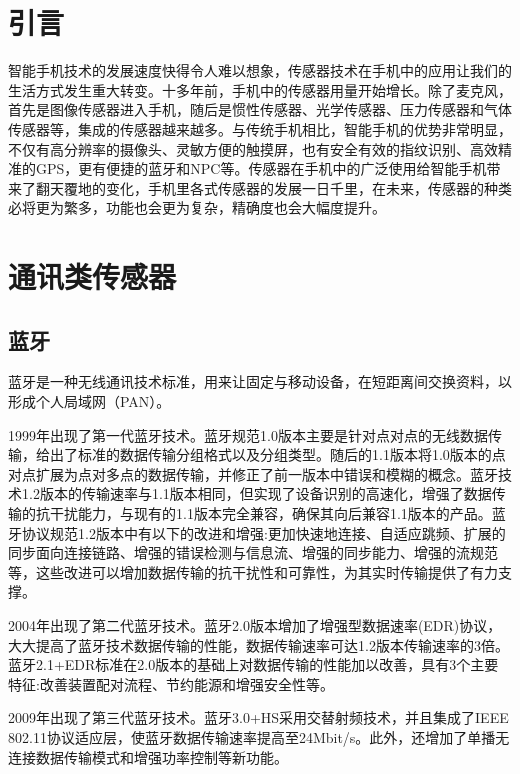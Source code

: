\documentclass[a4paper,11pt,onecolumn,twoside]{article}
\begin{document}
\begin{multicols}{2}

\section{引言}

智能手机技术的发展速度快得令人难以想象，传感器技术在手机中的应用让我们的生活方式发生重大转变。十多年前，手机中的传感器用量开始增长。除了麦克风，首先是图像传感器进入手机，随后是惯性传感器、光学传感器、压力传感器和气体传感器等，集成的传感器越来越多。与传统手机相比，智能手机的优势非常明显，不仅有高分辨率的摄像头、灵敏方便的触摸屏，也有安全有效的指纹识别、高效精准的GPS，更有便捷的蓝牙和NPC等。传感器在手机中的广泛使用给智能手机带来了翻天覆地的变化，手机里各式传感器的发展一日千里，在未来，传感器的种类必将更为繁多，功能也会更为复杂，精确度也会大幅度提升。


\section{通讯类传感器}

\subsection{蓝牙}

蓝牙是一种无线通讯技术标准，用来让固定与移动设备，在短距离间交换资料，以形成个人局域网（PAN）。

1999年出现了第一代蓝牙技术。蓝牙规范1.0版本主要是针对点对点的无线数据传输，给出了标准的数据传输分组格式以及分组类型。随后的1.1版本将1.0版本的点对点扩展为点对多点的数据传输，并修正了前一版本中错误和模糊的概念。蓝牙技术1.2版本的传输速率与1.1版本相同，但实现了设备识别的高速化，增强了数据传输的抗干扰能力，与现有的1.1版本完全兼容，确保其向后兼容1.1版本的产品。蓝牙协议规范1.2版本中有以下的改进和增强:更加快速地连接、自适应跳频、扩展的同步面向连接链路、增强的错误检测与信息流、增强的同步能力、增强的流规范等，这些改进可以增加数据传输的抗干扰性和可靠性，为其实时传输提供了有力支撑。

2004年出现了第二代蓝牙技术。蓝牙2.0版本增加了增强型数据速率(EDR)协议，大大提高了蓝牙技术数据传输的性能，数据传输速率可达1.2版本传输速率的3倍。蓝牙2.1+EDR标准在2.0版本的基础上对数据传输的性能加以改善，具有3个主要特征:改善装置配对流程、节约能源和增强安全性等。

2009年出现了第三代蓝牙技术。蓝牙3.0+HS采用交替射频技术，并且集成了IEEE 802.11协议适应层，使蓝牙数据传输速率提高至24Mbit/s。此外，还增加了单播无连接数据传输模式和增强功率控制等新功能。


\end{multicols}
\end{document}
